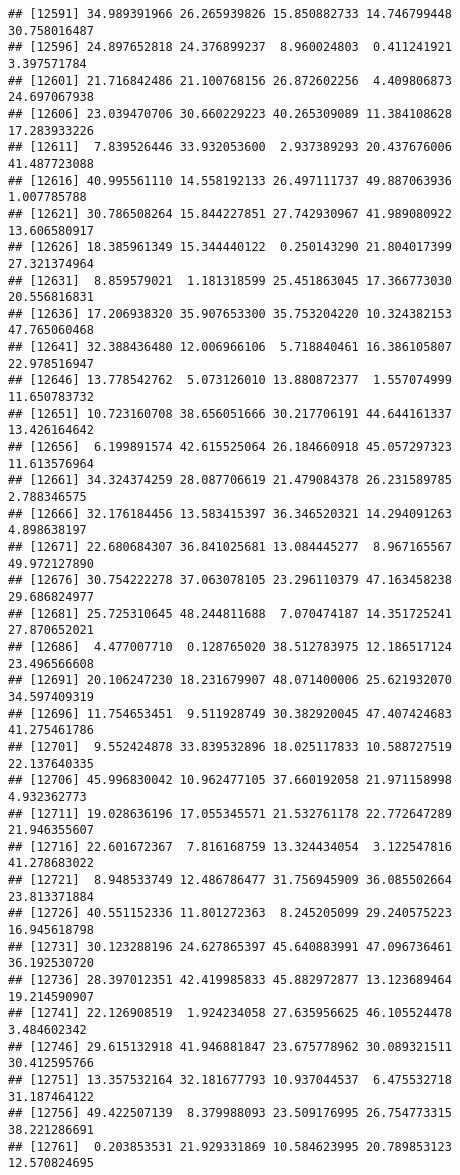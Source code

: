 \documentclass[
]{article}
\begin{document}
\begin{verbatim}
## [12591] 34.989391966 26.265939826 15.850882733 14.746799448 30.758016487
## [12596] 24.897652818 24.376899237  8.960024803  0.411241921  3.397571784
## [12601] 21.716842486 21.100768156 26.872602256  4.409806873 24.697067938
## [12606] 23.039470706 30.660229223 40.265309089 11.384108628 17.283933226
## [12611]  7.839526446 33.932053600  2.937389293 20.437676006 41.487723088
## [12616] 40.995561110 14.558192133 26.497111737 49.887063936  1.007785788
## [12621] 30.786508264 15.844227851 27.742930967 41.989080922 13.606580917
## [12626] 18.385961349 15.344440122  0.250143290 21.804017399 27.321374964
## [12631]  8.859579021  1.181318599 25.451863045 17.366773030 20.556816831
## [12636] 17.206938320 35.907653300 35.753204220 10.324382153 47.765060468
## [12641] 32.388436480 12.006966106  5.718840461 16.386105807 22.978516947
## [12646] 13.778542762  5.073126010 13.880872377  1.557074999 11.650783732
## [12651] 10.723160708 38.656051666 30.217706191 44.644161337 13.426164642
## [12656]  6.199891574 42.615525064 26.184660918 45.057297323 11.613576964
## [12661] 34.324374259 28.087706619 21.479084378 26.231589785  2.788346575
## [12666] 32.176184456 13.583415397 36.346520321 14.294091263  4.898638197
## [12671] 22.680684307 36.841025681 13.084445277  8.967165567 49.972127890
## [12676] 30.754222278 37.063078105 23.296110379 47.163458238 29.686824977
## [12681] 25.725310645 48.244811688  7.070474187 14.351725241 27.870652021
## [12686]  4.477007710  0.128765020 38.512783975 12.186517124 23.496566608
## [12691] 20.106247230 18.231679907 48.071400006 25.621932070 34.597409319
## [12696] 11.754653451  9.511928749 30.382920045 47.407424683 41.275461786
## [12701]  9.552424878 33.839532896 18.025117833 10.588727519 22.137640335
## [12706] 45.996830042 10.962477105 37.660192058 21.971158998  4.932362773
## [12711] 19.028636196 17.055345571 21.532761178 22.772647289 21.946355607
## [12716] 22.601672367  7.816168759 13.324434054  3.122547816 41.278683022
## [12721]  8.948533749 12.486786477 31.756945909 36.085502664 23.813371884
## [12726] 40.551152336 11.801272363  8.245205099 29.240575223 16.945618798
## [12731] 30.123288196 24.627865397 45.640883991 47.096736461 36.192530720
## [12736] 28.397012351 42.419985833 45.882972877 13.123689464 19.214590907
## [12741] 22.126908519  1.924234058 27.635956625 46.105524478  3.484602342
## [12746] 29.615132918 41.946881847 23.675778962 30.089321511 30.412595766
## [12751] 13.357532164 32.181677793 10.937044537  6.475532718 31.187464122
## [12756] 49.422507139  8.379988093 23.509176995 26.754773315 38.221286691
## [12761]  0.203853531 21.929331869 10.584623995 20.789853123 12.570824695

\end{verbatim}
\end{document}

